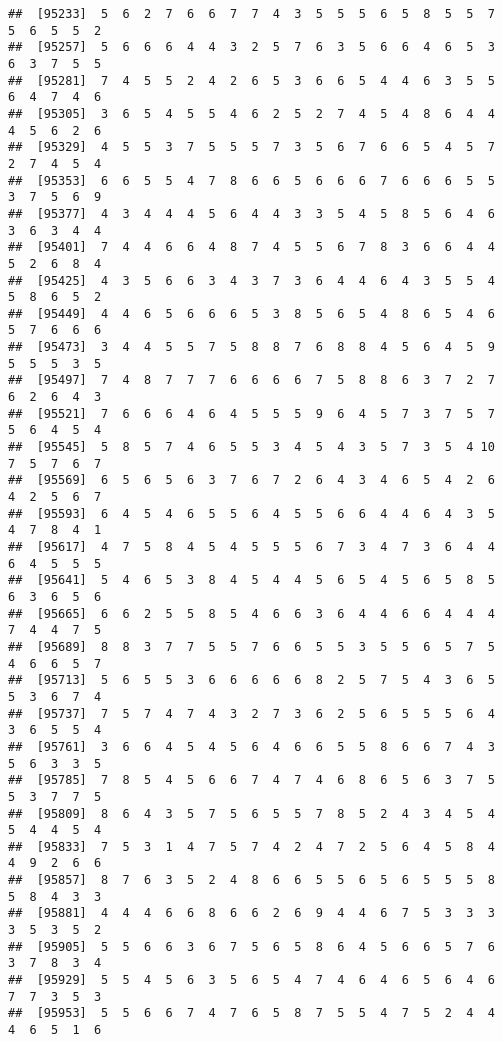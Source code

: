 \documentclass[
]{book}
\begin{document}
\begin{verbatim}
##  [95233]  5  6  2  7  6  6  7  7  4  3  5  5  5  6  5  8  5  5  7  5  6  5  5  2
##  [95257]  5  6  6  6  4  4  3  2  5  7  6  3  5  6  6  4  6  5  3  6  3  7  5  5
##  [95281]  7  4  5  5  2  4  2  6  5  3  6  6  5  4  4  6  3  5  5  6  4  7  4  6
##  [95305]  3  6  5  4  5  5  4  6  2  5  2  7  4  5  4  8  6  4  4  4  5  6  2  6
##  [95329]  4  5  5  3  7  5  5  5  7  3  5  6  7  6  6  5  4  5  7  2  7  4  5  4
##  [95353]  6  6  5  5  4  7  8  6  6  5  6  6  6  7  6  6  6  5  5  3  7  5  6  9
##  [95377]  4  3  4  4  4  5  6  4  4  3  3  5  4  5  8  5  6  4  6  3  6  3  4  4
##  [95401]  7  4  4  6  6  4  8  7  4  5  5  6  7  8  3  6  6  4  4  5  2  6  8  4
##  [95425]  4  3  5  6  6  3  4  3  7  3  6  4  4  6  4  3  5  5  4  5  8  6  5  2
##  [95449]  4  4  6  5  6  6  6  5  3  8  5  6  5  4  8  6  5  4  6  5  7  6  6  6
##  [95473]  3  4  4  5  5  7  5  8  8  7  6  8  8  4  5  6  4  5  9  5  5  5  3  5
##  [95497]  7  4  8  7  7  7  6  6  6  6  7  5  8  8  6  3  7  2  7  6  2  6  4  3
##  [95521]  7  6  6  6  4  6  4  5  5  5  9  6  4  5  7  3  7  5  7  5  6  4  5  4
##  [95545]  5  8  5  7  4  6  5  5  3  4  5  4  3  5  7  3  5  4 10  7  5  7  6  7
##  [95569]  6  5  6  5  6  3  7  6  7  2  6  4  3  4  6  5  4  2  6  4  2  5  6  7
##  [95593]  6  4  5  4  6  5  5  6  4  5  5  6  6  4  4  6  4  3  5  4  7  8  4  1
##  [95617]  4  7  5  8  4  5  4  5  5  5  6  7  3  4  7  3  6  4  4  6  4  5  5  5
##  [95641]  5  4  6  5  3  8  4  5  4  4  5  6  5  4  5  6  5  8  5  6  3  6  5  6
##  [95665]  6  6  2  5  5  8  5  4  6  6  3  6  4  4  6  6  4  4  4  7  4  4  7  5
##  [95689]  8  8  3  7  7  5  5  7  6  6  5  5  3  5  5  6  5  7  5  4  6  6  5  7
##  [95713]  5  6  5  5  3  6  6  6  6  6  8  2  5  7  5  4  3  6  5  5  3  6  7  4
##  [95737]  7  5  7  4  7  4  3  2  7  3  6  2  5  6  5  5  5  6  4  3  6  5  5  4
##  [95761]  3  6  6  4  5  4  5  6  4  6  6  5  5  8  6  6  7  4  3  5  6  3  3  5
##  [95785]  7  8  5  4  5  6  6  7  4  7  4  6  8  6  5  6  3  7  5  5  3  7  7  5
##  [95809]  8  6  4  3  5  7  5  6  5  5  7  8  5  2  4  3  4  5  4  5  4  4  5  4
##  [95833]  7  5  3  1  4  7  5  7  4  2  4  7  2  5  6  4  5  8  4  4  9  2  6  6
##  [95857]  8  7  6  3  5  2  4  8  6  6  5  5  6  5  6  5  5  5  8  5  8  4  3  3
##  [95881]  4  4  4  6  6  8  6  6  2  6  9  4  4  6  7  5  3  3  3  3  5  3  5  2
##  [95905]  5  5  6  6  3  6  7  5  6  5  8  6  4  5  6  6  5  7  6  3  7  8  3  4
##  [95929]  5  5  4  5  6  3  5  6  5  4  7  4  6  4  6  5  6  4  6  7  7  3  5  3
##  [95953]  5  5  6  6  7  4  7  6  5  8  7  5  5  4  7  5  2  4  4  4  6  5  1  6

\end{verbatim}
\end{document}
